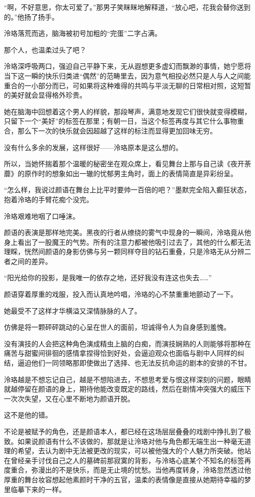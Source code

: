 \documentclass[UTF8, scheme = chinese, openany]{ctexbook}
\begin{document}
“啊，不好意思，你太可爱了。”那男子笑眯眯地解释道，“放心吧，花我会替你送到的。”他扬了扬手。

泠珞落荒而逃，脑海被初号加粗的“完蛋”二字占满。

那个人，也温柔过头了吧？

泠珞深呼吸两口，强迫自己平静下来，无从遐想更多虚幻而飘渺的事情，她宁愿将当下这一瞬的快乐归类进“偶然”的范畴里去，因为意气相投必然只是人与人之间能重合的一小部分而已，可如果将这种难得的共鸣与平淡无聊的日常相对照，这短暂的美好就会显得格外珍贵。

她在脑海中回想着这个男人的样貌，那段琴声，满意地发现它们很快就变得模糊，只留下一个“美好”的标签在那里；有朝一日，当这个标签再度与其它什么事物重合，那么下一次的快乐就会因超越了这样的标注而显得更加回味无穷。

没有什么多余的发展，这样很好——泠珞原本是这么想的。

所以，当她怀揣着那个温暖的秘密坐在观众席上，看见舞台上那与自己读《夜开荼蘼》的原作时的想象如出一辙的忧郁男主角时，面上的表情简直是异彩纷呈。

“怎么样，我说过颜语在舞台上比平时要帅一百倍的吧？”墨默完全陷入癫狂状态，抱着泠珞的手臂花痴个没完。

泠珞艰难地咽了口唾沫。

颜语的表演是那样地完美。黑夜的行者从缭绕的雾气中现身的一瞬间，泠珞竟从他身上看出了一股魔王的气势。所有的注意力都被他吸引过去了，其他的什么都无法理睬，恍然间颜语的身影仿佛与另一颗同样夺目的钻石重叠，只是泠珞无从分辨二者之间的差异。

“阳光给你的投影，是我唯一的依存之地，还好我没有连这也失去……”

颜语穿着厚重的戏服，投入而认真地吟唱，泠珞的心不禁重重地颤动了一下。

她最受不了这样才华横溢又深情脉脉的人了。

仿佛是将一颗砰砰跳动的心呈在世人的面前，坦诚得令人为自身感到羞愧。

没有演技的人会把这种角色演成精虫上脑的白痴，而演技娴熟的人则能够将那种在痛苦与甜蜜间徘徊的感情拿捏得恰到好处，会逼迫观众也面临与剧中人同样的纠结，逼迫他们一同领略那即使做出了选择、也无法反抗命运的剧本的安排的不甘。

泠珞越是不想忘记自己，越是不想陷进去，不想思考爱与恨这样深刻的问题，眼睛就越停留在颜语的身上，期待他能改变既定的路线，然后在剧情冲突强大的威压下一次次失望，又在心里不断地为颜语开脱。

这不是他的错。

不论是被赋予的角色，还是颜语本人，都已经在这场层层叠叠的戏剧中挣扎到了极致。如果说颜语有什么不该做的，那就是让泠珞对他与角色都无端生出一种毫无道理的希望，去认为剧中无法被更改的现实，可以被他强大的个人魅力所突破。他站在曾经亲手讨伐自己之人的墓碑前那寂寞的背影，与泠珞心底某个不知名的标签再度重合，弥漫出的不是快乐，而是无止境的忧愁。当他再度转身，泠珞忽然透过他厚重的舞台妆容想起他素颜时干净的五官，温柔的表情像是直接从她期待幸福的梦里临摹下来的一样。
\end{document}
